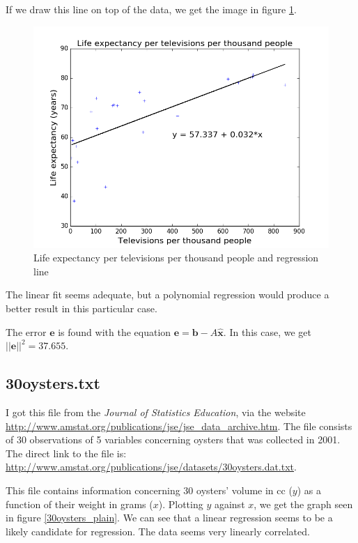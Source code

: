 \documentclass[]{article}
\begin{document}
If we draw this line on top of the data, we get the image in figure \ref{TV_reg}.

\begin{figure}[h]
\centering
\includegraphics{TV_reg.png}
\caption{Life expectancy per televisions per thousand people and regression line}
\label{TV_reg}
\end{figure}

The linear fit seems adequate, but a polynomial regression would produce a better result in this particular case.

The error $\textbf{e}$ is found with the equation $\textbf{e} = \textbf{b} - A\widehat{\textbf{x}}$. In this case, we get $||\textbf{e}||^2 = 37.655$.

\newpage
\subsection*{30oysters.txt}
I got this file from the \textit{Journal of Statistics Education}, via the website \url{http://www.amstat.org/publications/jse/jse_data_archive.htm}. The file consists of 30 observations of 5 variables concerning oysters that was collected in 2001. The direct link to the file is: \url{http://www.amstat.org/publications/jse/datasets/30oysters.dat.txt}.

This file contains information concerning 30 oysters' volume in cc ($y$) as a function of their weight in grams ($x$). Plotting $y$ against $x$, we get the graph seen in figure \ref{30oysters_plain}. We can see that a linear regression seems to be a likely candidate for regression. The data seems very linearly correlated.
\end{document}
